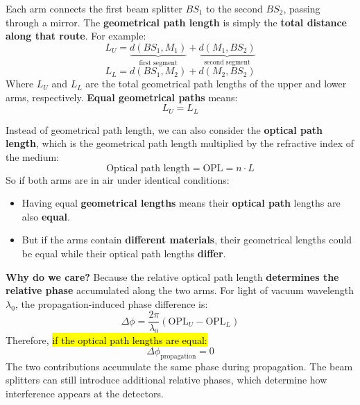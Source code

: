 \begin{deepeningbox}
    Each arm connects the first beam splitter $BS_1$ to the second $BS_2$, passing through a mirror.
    The \textbf{geometrical path length} is simply the \textbf{total distance along that route}.
    For example:
    \begin{equation*}
        L_U=\underbrace{d(BS_1,M_1)}_{\text{first segment}}+
        \underbrace{d(M_1,BS_2)}_{\text{second segment}}
    \end{equation*}
    \begin{equation*}
        L_L=d(BS_1,M_2)+d(M_2,BS_2)
    \end{equation*}
    Where $L_U$ and $L_L$ are the total geometrical path lengths of the upper and lower arms, respectively. \textbf{Equal geometrical paths} means:
    \begin{equation*}
        L_U=L_L
    \end{equation*}

    \highspace
    Instead of geometrical path length, we can also consider the \textbf{optical path length}, which is the geometrical path length multiplied by the refractive index of the medium:
    \begin{equation*}
        \text{Optical path length} = \text{OPL} = n \cdot L
    \end{equation*}
    So if both arms are in air under identical conditions:
    \begin{itemize}
        \item Having equal \textbf{geometrical lengths} means their \textbf{optical path} lengths are also \textbf{equal}.
        \item But if the arms contain \textbf{different materials}, their geometrical lengths could be equal while their optical path lengths \textbf{differ}.
    \end{itemize}
    \textcolor{Green3}{ \textbf{Why do we care?}} Because the relative optical path length \textbf{determines the relative phase} accumulated along the two arms. For light of vacuum wavelength $\lambda_0$, the propagation-induced phase difference is:
    \begin{equation*}
        \Delta\phi=\frac{2\pi}{\lambda_0}
        \left(\mathrm{OPL}_U-\mathrm{OPL}_L\right)
    \end{equation*}
    Therefore, \hl{if the optical path lengths are equal:}
    \begin{equation*}
        \Delta\phi_{\text{propagation}}=0
    \end{equation*}
    The two contributions accumulate the same phase during propagation. The beam splitters can still introduce additional relative phases, which determine how interference appears at the detectors.


\end{deepeningbox}
